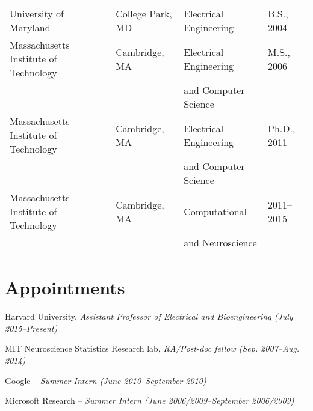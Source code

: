 \documentclass[12pt]{article}
\renewenvironment{itemize}{
  \begin{list}{}{
    \setlength{\itemsep}{0.25em}
    \setlength{\parskip}{0pt}
    \setlength{\parsep}{0.25em}
  }
}{
  \end{list}
}
\begin{document}
\begin{tabular}{llll}
University of Maryland & College Park, MD & Electrical Engineering & B.S., 2004 \\
Massachusetts Institute of Technology & Cambridge, MA & Electrical Engineering & M.S., 2006 \\
 &  & and Computer Science & \\
Massachusetts Institute of Technology & Cambridge, MA & Electrical Engineering & Ph.D., 2011 \\
 &  & and Computer Science & \\
Massachusetts Institute of Technology & Cambridge, MA & Computational & 2011--2015 \\
 &  & and Neuroscience & \\

\end{tabular}


\section*{Appointments}

\begin{itemize}
    \item Harvard University, \emph{Assistant Professor of Electrical and Bioengineering (July 2015--Present)}

    \item MIT Neuroscience Statistics Research lab, \emph{RA/Post-doc fellow (Sep. 2007--Aug. 2014)}

    \item Google -- \emph{Summer Intern (June 2010--September 2010)}

    \item Microsoft Research -- \emph{Summer Intern (June 2006/2009--September 2006/2009)}
\end{itemize}
\end{document}
